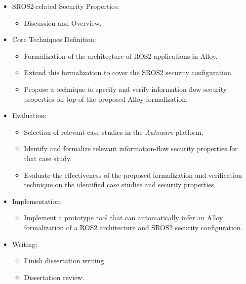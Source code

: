 \begin{itemize}
\item SROS2-related Security Properties:
    \begin{itemize}
        \item Discussion and Overview.
    \end{itemize}

\item Core Techniques Definition:
    \begin{itemize}
        \item Formalization of the architecture of ROS2 applications in Alloy.
        \item Extend this formalization to cover the SROS2 security configuration.
        \item Propose a technique to specify and verify information-flow security properties on top of the proposed Alloy formalization.
    \end{itemize}

\item Evaluation:
    \begin{itemize}
        \item Selection of relevant case studies in the \textit{Autoware} platform.
        \item Identify and formalize relevant information-flow security properties for that case study.
        \item Evaluate the effectiveness of the proposed formalization and verification technique on the identified case studies and security properties.
    \end{itemize}

\item Implementation:
    \begin{itemize}
        \item Implement a prototype tool that can automatically infer an Alloy formalization of a ROS2 architecture and SROS2 security configuration.
    \end{itemize}

\item Writing:
    \begin{itemize}
        \item Finish dissertation writing.
        \item Dissertation review.
    \end{itemize}
\end{itemize}